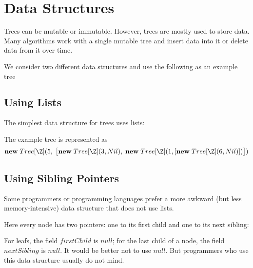 \section{Data Structures}

Trees can be mutable or immutable.
However, trees are mostly used to store data.
Many algorithms work with a single mutable tree and insert data into it or delete data from it over time.

We consider two different data structures and use the following as an example tree
\begin{center}
\end{center}

\subsection{Using Lists}\label{sec:ad:listtree}

The simplest data structure for trees uses lists:

\begin{acode}
\end{acode}

The example tree is represented as
\[\anew{Tree[\Z]}{5,\; \big[\anew{Tree[\Z]}{3,Nil},\;\anew{Tree[\Z]}{1, [\anew{Tree[\Z]}{6,Nil}]}\big]}\]

\subsection{Using Sibling Pointers}\label{sec:ad:pointertrees}

Some programmers or programming languages prefer a more awkward (but less memory-intensive) data structure that does not use lists.

Here every node has two pointers: one to its first child and one to its next sibling:
\begin{acode}
\end{acode}
For leafs, the field $firstChild$ is $null$; for the last child of a node, the field $nextSibling$ is $null$.
It would be better not to use $null$. But programmers who use this data structure usually do not mind.


